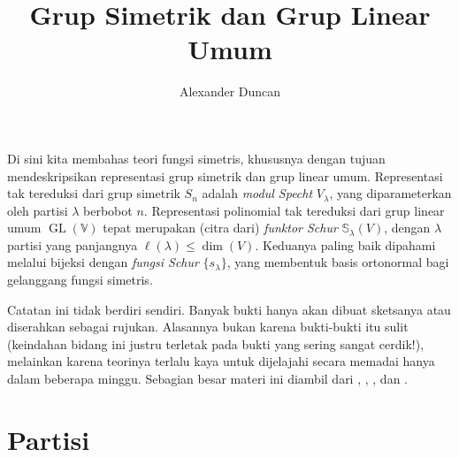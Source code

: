 \documentclass[12pt]{article}
\theoremstyle{plain}
\theoremstyle{definition}
\theoremstyle{remark}
\numberwithin{equation}{section}
\begin{document}
\title{Grup Simetrik dan Grup Linear Umum}
\author{Alexander Duncan}

\maketitle

Di sini kita membahas teori fungsi simetris, khususnya dengan
tujuan mendeskripsikan representasi grup simetrik dan grup
linear umum.
Representasi tak tereduksi dari grup simetrik
$S_n$ adalah \emph{modul Specht} $V_\lambda$, yang diparameterkan
oleh partisi $\lambda$ berbobot $n$.
Representasi polinomial tak tereduksi dari grup linear umum
$\operatorname{GL}(\mathbb{V})$ tepat merupakan (citra dari)
\emph{funktor Schur} $\mathbb{S}_\lambda(V)$, dengan $\lambda$
partisi yang panjangnya $\ell(\lambda) \le \dim(V)$.
Keduanya paling baik dipahami melalui bijeksi dengan \emph{fungsi
Schur} $\{ s_\lambda \}$, yang membentuk basis ortonormal bagi
gelanggang fungsi simetris. 

Catatan ini tidak berdiri sendiri. Banyak bukti hanya akan dibuat sketsanya atau
diserahkan sebagai rujukan. Alasannya bukan karena bukti-bukti itu sulit
(keindahan bidang ini justru terletak pada bukti yang sering sangat cerdik!), melainkan karena
teorinya terlalu kaya untuk dijelajahi secara memadai hanya dalam beberapa minggu.
Sebagian besar materi ini diambil dari
\cite[\S{4,6,A}]{FultonHarris},
\cite[\S{5.12--5.19}]{Etingof},
\cite[\S{I}]{Macdonald}, dan
\cite[\S{7}]{Stanley2}.


\section{Partisi}
\end{document}
